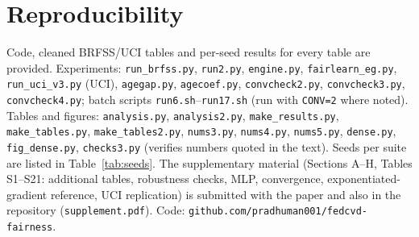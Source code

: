 \section*{Reproducibility}
Code, cleaned BRFSS/UCI tables and per-seed results for every table are provided. Experiments: \texttt{run\_brfss.py}, \texttt{run2.py}, \texttt{engine.py}, \texttt{fairlearn\_eg.py}, \texttt{run\_uci\_v3.py} (UCI), \texttt{agegap.py}, \texttt{agecoef.py}, \texttt{convcheck2.py}, \texttt{convcheck3.py}, \texttt{convcheck4.py}; batch scripts \texttt{run6.sh}--\texttt{run17.sh} (run with \texttt{CONV=2} where noted). Tables and figures: \texttt{analysis.py}, \texttt{analysis2.py}, \texttt{make\_results.py}, \texttt{make\_tables.py}, \texttt{make\_tables2.py}, \texttt{nums3.py}, \texttt{nums4.py}, \texttt{nums5.py}, \texttt{dense.py}, \texttt{fig\_dense.py}, \texttt{checks3.py} (verifies numbers quoted in the text). Seeds per suite are listed in Table~\ref{tab:seeds}. The supplementary material (Sections A--H, Tables S1--S21: additional tables, robustness checks, MLP, convergence, exponentiated-gradient reference, UCI replication) is submitted with the paper and also in the repository (\texttt{supplement.pdf}). Code: \texttt{github.com/pradhuman001/fedcvd-fairness}.

